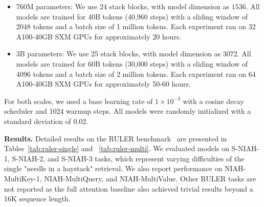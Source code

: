 \begin{itemize}
    \item 760M parameters: We use 24 stack blocks, with model dimension as $1536$. All models are trained for 40B tokens (40,960 steps) with a sliding window of 2048 tokens and a batch size of 1 million tokens. Each experiment ran on 32 A100-40GB SXM GPUs for approximately 20 hours.
    \item 3B parameters: We use 25 stack blocks, with model dimension as $3072$. All models are trained for 60B tokens (30,000 steps) with a sliding window of 4096 tokens and a batch size of 2 million tokens. Each experiment ran on 64 A100-40GB SXM GPUs for approximately 50-60 hours.
\end{itemize}
For both scales, we used a base learning rate of $1\times 10^{-3}$ 
 with a cosine decay scheduler and 1024 warmup steps. All models were randomly initialized with a standard deviation of 0.02.

\noindent\textbf{Results.} Detailed results on the RULER benchmark~\cite{hsiehruler} are presented in Tables~\ref{tab:ruler-single} and ~\ref{tab:ruler-multi}. We evaluated models on S-NIAH-1, S-NIAH-2, and S-NIAH-3 tasks, which represent varying difficulties of the single "needle in a haystack" retrieval. We also report performance on NIAH-MultiKey-1, NIAH-MultiQuery, and NIAH-MultiValue. Other RULER tasks are not reported as the full attention baseline also achieved trivial results beyond a 16K sequence length.



